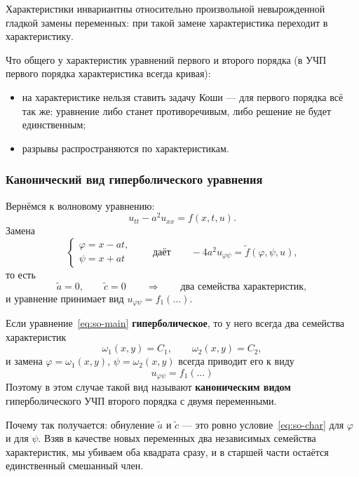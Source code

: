 \begin{remark}[замечание 2]
Характеристики инвариантны относительно произвольной невырожденной гладкой
замены переменных: при такой замене характеристика переходит в
характеристику.
\end{remark}

\begin{remark}[замечание 3]
Что общего у характеристик уравнений первого и второго порядка (в УЧП первого
порядка характеристика всегда кривая):
\begin{itemize}[leftmargin=1.6em]
  \item на характеристике нельзя ставить задачу Коши — для первого порядка
        всё так же: уравнение либо станет противоречивым, либо решение не
        будет единственным;
  \item разрывы распространяются по характеристикам.
\end{itemize}
\end{remark}

\subsubsection*{Канонический вид гиперболического уравнения}

Вернёмся к волновому уравнению:
\[
  u_{tt} - a^2 u_{xx} = f(x,t,u) .
\]
Замена
\[
  \begin{cases} \varphi = x - at, \\ \psi = x + at \end{cases}
  \qquad\text{даёт}\qquad
  -4a^2 u_{\varphi\psi} = \widetilde f(\varphi,\psi,u) ,
\]
то есть
\[
  \widetilde a = 0, \qquad \widetilde c = 0
  \qquad\Longrightarrow\qquad \text{два семейства характеристик},
\]
и уравнение принимает вид $u_{\varphi\psi} = f_1(\dots)$.

\medskip
Если уравнение~\eqref{eq:so-main} \textbf{гиперболическое}, то у него всегда
два семейства характеристик
\[
  \omega_1(x,y) = C_1, \qquad \omega_2(x,y) = C_2 ,
\]
и замена $\varphi = \omega_1(x,y)$, $\psi = \omega_2(x,y)$ всегда приводит
его к виду
\[
  \boxed{\ u_{\varphi\psi} = f_1(\dots)\ }
\]
Поэтому в этом случае такой вид называют \textbf{каноническим видом}
гиперболического УЧП второго порядка с двумя переменными.

\begin{idea}
Почему так получается: обнуление $\widetilde a$ и $\widetilde c$ — это ровно
условие~\eqref{eq:so-char} для $\varphi$ и для $\psi$. Взяв в качестве новых
переменных два независимых семейства характеристик, мы убиваем оба квадрата
сразу, и в старшей части остаётся единственный смешанный член.
\end{idea}

